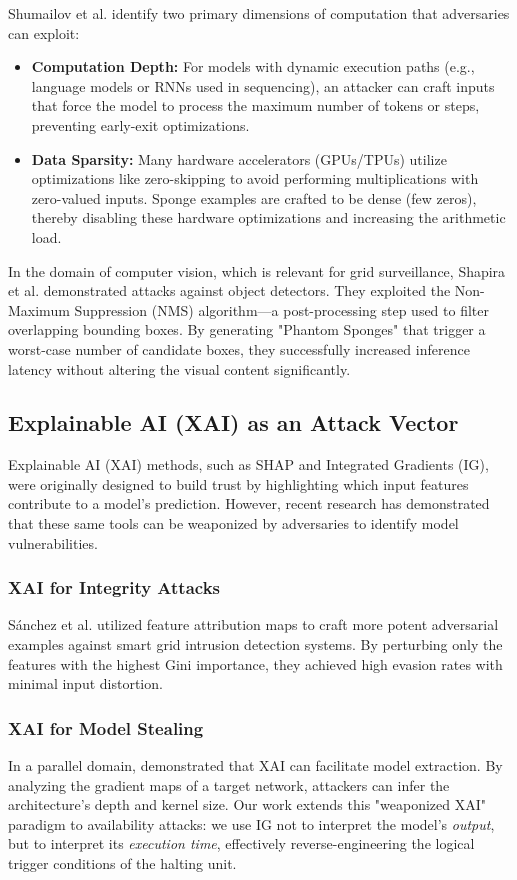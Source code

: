 Shumailov et al. identify two primary dimensions of computation that adversaries can exploit:
\begin{itemize}
    \item \textbf{Computation Depth:} For models with dynamic execution paths (e.g., language models or RNNs used in sequencing), an attacker can craft inputs that force the model to process the maximum number of tokens or steps, preventing early-exit optimizations.
    \item \textbf{Data Sparsity:} Many hardware accelerators (GPUs/TPUs) utilize optimizations like zero-skipping to avoid performing multiplications with zero-valued inputs. Sponge examples are crafted to be dense (few zeros), thereby disabling these hardware optimizations and increasing the arithmetic load.
\end{itemize}

In the domain of computer vision, which is relevant for grid surveillance, Shapira et al. \cite{shapira2023phantom} demonstrated attacks against object detectors. They exploited the Non-Maximum Suppression (NMS) algorithm—a post-processing step used to filter overlapping bounding boxes. By generating "Phantom Sponges" that trigger a worst-case number of candidate boxes, they successfully increased inference latency without altering the visual content significantly.

\subsection{Explainable AI (XAI) as an Attack Vector}
Explainable AI (XAI) methods, such as SHAP and Integrated Gradients (IG), were originally designed to build trust by highlighting which input features contribute to a model's prediction. However, recent research has demonstrated that these same tools can be weaponized by adversaries to identify model vulnerabilities.

\subsubsection{XAI for Integrity Attacks}
S{\'a}nchez et al. \cite{sanchez2024attacking} utilized feature attribution maps to craft more potent adversarial examples against smart grid intrusion detection systems. By perturbing only the features with the highest Gini importance, they achieved high evasion rates with minimal input distortion.

\subsubsection{XAI for Model Stealing}
In a parallel domain, \cite{steganographic2026} demonstrated that XAI can facilitate model extraction. By analyzing the gradient maps of a target network, attackers can infer the architecture's depth and kernel size. Our work extends this "weaponized XAI" paradigm to availability attacks: we use IG not to interpret the model's \textit{output}, but to interpret its \textit{execution time}, effectively reverse-engineering the logical trigger conditions of the halting unit.

